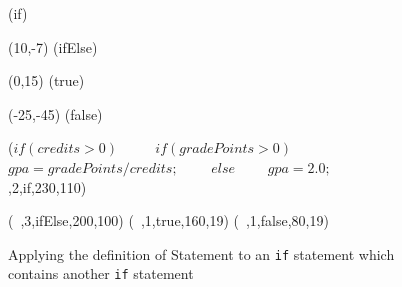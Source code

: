 




\begin {figure}

\Draw

\MarkLoc(if)

\Move(10,-7)
\MarkLoc(ifElse)

\Move(0,15)
\MarkLoc(true)

\Move(-25,-45)
\MarkLoc(false)


\boxIt($if (credits > 0)$ \hfill			~~~~
  	\hspace{10pt}$if (gradePoints > 0)$\hfill	~~~~
       	\hspace{20pt} $gpa = gradePoints / credits;$\hfill ~~~~
	\hspace{10pt}$else$\hfill			~~~~
	\hspace{20pt}$gpa = 2.0;$ \hfill		~~~~
	,2,if,230,110)

\boxIt(~,3,ifElse,200,100)
\boxIt(~,1,true,160,19)
\boxIt(~,1,false,80,19)



\EndDraw

\caption {Applying the definition of 
Statement to
an \texttt{if} statement which
contains another \texttt{if}
statement} 

\label {fig:ifStmtAmb1}

\end {figure}


